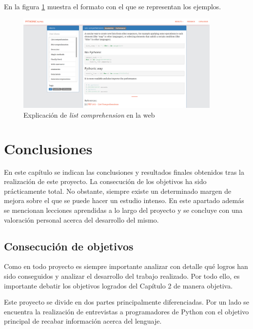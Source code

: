 \documentclass[a4paper, 12pt]{book}
\begin{document}
En la figura \ref{fig:ejemploidiom} muestra el formato con el que se representan los ejemplos.
\begin{figure}[H]
    \centering
    \includegraphics[width=0.9\textwidth]{img/1idioms.png}
    \caption{Explicación de \textit{list comprehension} en la web}
    \label{fig:ejemploidiom}
\end{figure}


\cleardoublepage
\chapter{Conclusiones}
\label{chap:conclusiones}

En este capítulo se indican las conclusiones y resultados finales obtenidos tras la realización de este proyecto. La consecución de los objetivos ha sido prácticamente total. No obstante, siempre existe un determinado margen de mejora sobre el que se puede hacer un estudio intenso. En este apartado además se mencionan lecciones aprendidas a lo largo del proyecto y se concluye con una valoración personal acerca del desarrollo del mismo.

\section{Consecución de objetivos}
\label{sec:consecucion-objetivos}

Como en todo proyecto es siempre importante analizar con detalle qué logros han sido conseguidos y analizar el desarrollo del trabajo realizado. Por todo ello, es importante debatir los objetivos logrados del Capítulo 2 de manera objetiva.

Este proyecto se divide en dos partes principalmente diferenciadas. Por un lado se encuentra la realización de entrevistas a programadores de Python con el objetivo principal de recabar información acerca del lenguaje.
\end{document}
